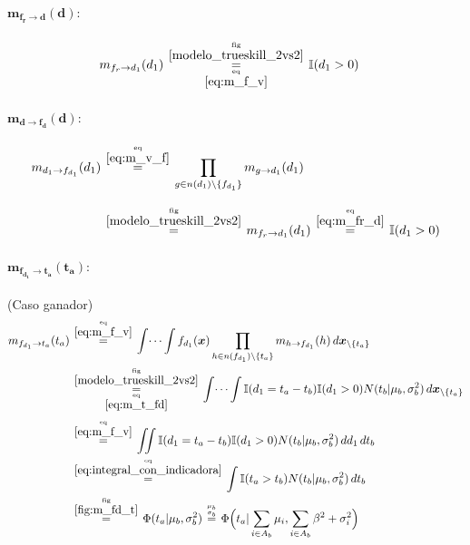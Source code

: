 \documentclass[article]{jss}
\newcommand\hfrac[2]{\genfrac{}{}{0pt}{}{#1}{#2}} %
\begin{document}
\begin{appendix}
\paragraph{$\bm{m_{f_r \rightarrow d}(d)}:$}

\begin{equation}\label{eq:m_fr_d}
\begin{split}
m_{f_r \rightarrow d_1}(d_1) & \overset{\hfrac{\text{fig}}{\ref{modelo_trueskill_2vs2}}}{\underset{\hfrac{\text{eq}}{\ref{eq:m_f_v}}}{=}} \mathbb{I}(d_1 > 0)
\end{split}
\end{equation}


\paragraph{$\bm{m_{d \rightarrow f_d}(d)}:$}
\begin{equation}\label{eq:m_d_fd}
\begin{split}
m_{d_1 \rightarrow f_{d_1}}(d_1) & \overset{\hfrac{\text{eq}}{\ref{eq:m_v_f}}}{=} \prod_{g \in n(d_1) \setminus  \{f_{d_1} \}} m_{g \rightarrow d_1} (d_1) \\[0.3cm]
 & \overset{\hfrac{\text{fig}}{\ref{modelo_trueskill_2vs2}}}{=} m_{f_r \rightarrow d_1}(d_1) \overset{\hfrac{\text{eq}}{\ref{eq:m_fr_d}}}{=} \mathbb{I}(d_1 > 0)
\end{split}
\end{equation}

\paragraph{$\bm{m_{f_{d_1} \rightarrow t_a}(t_a)}:$} (Caso ganador)
\begin{equation}\label{eq:m_fd_ta}
\begin{split}
m_{f_{d_1} \rightarrow t_a}(t_a) & \overset{\hfrac{\text{eq}}{\ref{eq:m_f_v}}}{=} \int \dots \int f_{d_1}(\bm{x}) \prod_{h \in n(f_{d_1}) \setminus \{t_a\} } m_{h \rightarrow f_{d_1}}(h) \, d\bm{x}_{\setminus \{t_a\} }  \\
&\overset{\hfrac{\text{fig}}{\ref{modelo_trueskill_2vs2}}}{\underset{\hfrac{\text{eq}}{\ref{eq:m_t_fd}}}{=}}  \int \dots \int \mathbb{I}(d_1 = t_a - t_b) \mathbb{I}(d_1 > 0) N(t_b | \mu_b , \sigma_b^2 )  \, d\bm{x}_{\setminus \{t_a\} } \\[0.1cm]
& \overset{\hfrac{\text{eq}}{\ref{eq:m_f_v}}}{=} \iint \mathbb{I}(d_1 = t_a - t_b) \mathbb{I}(d_1 > 0) N(t_b | \mu_b , \sigma_b^2 ) \, dd_1\,dt_b \\
& \overset{\hfrac{\text{eq}}{\ref{eq:integral_con_indicadora}}}{=} \int \mathbb{I}( t_a > t_b)  N(t_b | \mu_b , \sigma_b^2 ) \,dt_b  \\
& \overset{\hfrac{\text{fig}}{\ref{fig:m_fd_t}}}{=} \Phi (t_a| \mu_b, \sigma_b^2)  \overset{\hfrac{\mu_b}{\sigma_b}}{=}  \Phi \Big(t_a| \sum_{i \in A_b} \mu_i , \sum_{i \in A_b} \beta^2 + \sigma_i^2 \Big)
\end{split}
\end{equation}


\end{appendix}
\end{document}
